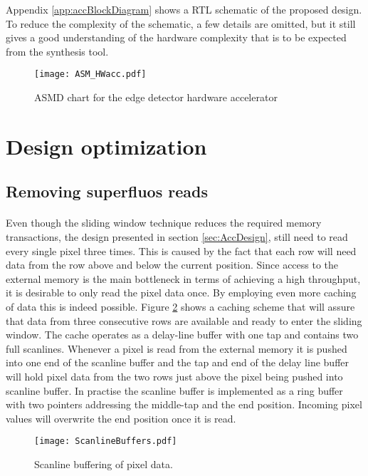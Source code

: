 Appendix \ref{app:accBlockDiagram} shows a RTL schematic of the proposed design. To reduce the complexity of the schematic, a few details are omitted, but it still gives a good understanding of the hardware complexity that is to be expected from the synthesis tool.

\begin{figure}[H]
	\centering
	\texttt{[image: ASM\_HWacc.pdf]}
	\caption{ASMD chart for the edge detector hardware accelerator}
	\label{fig:ASM_HW}
\end{figure}

\section{Design optimization}
\label{sec:Optimization}
\subsection*{Removing superfluos reads}
\label{sec:memaccess}
\paragraph*{}
Even though the sliding window technique reduces the required memory transactions, the design presented in section \ref{sec:AccDesign}, still need to read every single pixel three times. This is caused by the fact that each row will need data from the row above and below the current position. Since access to the external memory is the main bottleneck in terms of achieving a high throughput, it is desirable to only read the pixel data once. By employing even more caching of data this is indeed possible. Figure \ref{fig:ScanlineBuffers} shows a caching scheme that will assure that data from three consecutive rows are available and ready to enter the sliding window. The cache operates as a delay-line buffer with one tap and contains two full scanlines. Whenever a pixel is read from the external memory it is pushed into one end of the scanline buffer and the tap and end of the delay line buffer will hold pixel data from the two rows just above the pixel being pushed into  scanline buffer. In practise the scanline buffer is implemented as a ring buffer with two pointers addressing the middle-tap and the end position. 
Incoming pixel values will overwrite the end position once it is read.

\begin{figure}[H]
	\centering
	\texttt{[image: ScanlineBuffers.pdf]}
	\caption{Scanline buffering of pixel data.}
	\label{fig:ScanlineBuffers}
\end{figure}

